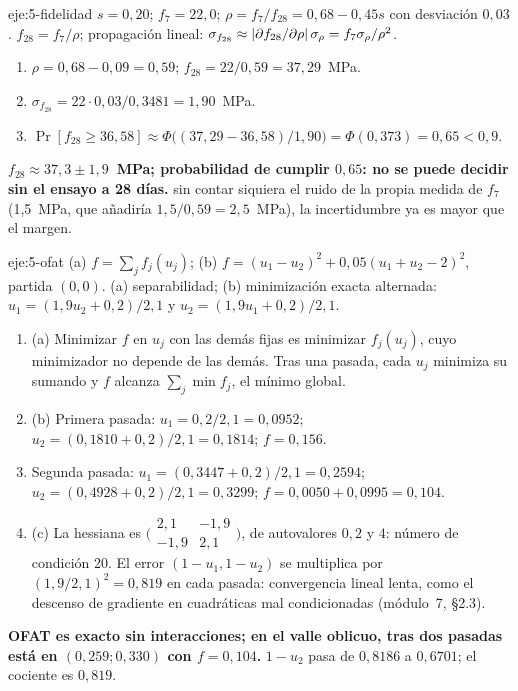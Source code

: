 \begin{solucion}{eje:5-fidelidad}
\datos $s=0{,}20$; $f_7=22{,}0$; $\rho=f_7/f_{28}=0{,}68-0{,}45s$ con desviación $0{,}03$.
\planteamiento $f_{28}=f_7/\rho$; propagación lineal: $\sigma_{f_{28}}\approx\lvert\partial f_{28}/\partial\rho\rvert\,\sigma_\rho=f_7\sigma_\rho/\rho^2$.
\pasos
\begin{enumerate}[label=\arabic*.]
  \item $\rho=0{,}68-0{,}09=0{,}59$; $f_{28}=22/0{,}59=37{,}29$~MPa.
  \item $\sigma_{f_{28}}=22\cdot0{,}03/0{,}3481=1{,}90$~MPa.
  \item $\Pr[f_{28}\ge36{,}58]\approx\Phi\bigl((37{,}29-36{,}58)/1{,}90\bigr)=\Phi(0{,}373)=0{,}65<0{,}9$.
\end{enumerate}
\resultado \textbf{$f_{28}\approx37{,}3\pm1{,}9$~MPa; probabilidad de cumplir $0{,}65$: no se puede decidir sin el ensayo a 28 días.}
\comprobacion sin contar siquiera el ruido de la propia medida de $f_7$ (1,5~MPa, que añadiría $1{,}5/0{,}59=2{,}5$~MPa), la incertidumbre ya es mayor que el margen.
\end{solucion}

\begin{solucion}{eje:5-ofat}
\datos (a) $f=\sum_jf_j(u_j)$; (b) $f=(u_1-u_2)^2+0{,}05(u_1+u_2-2)^2$, partida $(0,0)$.
\planteamiento (a) separabilidad; (b) minimización exacta alternada: $u_1=(1{,}9u_2+0{,}2)/2{,}1$ y $u_2=(1{,}9u_1+0{,}2)/2{,}1$.
\pasos
\begin{enumerate}[label=\arabic*.]
  \item (a) Minimizar $f$ en $u_j$ con las demás fijas es minimizar $f_j(u_j)$, cuyo minimizador no depende de las demás. Tras una pasada, cada $u_j$ minimiza su sumando y $f$ alcanza $\sum_j\min f_j$, el mínimo global.
  \item (b) Primera pasada: $u_1=0{,}2/2{,}1=0{,}0952$; $u_2=(0{,}1810+0{,}2)/2{,}1=0{,}1814$; $f=0{,}156$.
  \item Segunda pasada: $u_1=(0{,}3447+0{,}2)/2{,}1=0{,}2594$; $u_2=(0{,}4928+0{,}2)/2{,}1=0{,}3299$; $f=0{,}0050+0{,}0995=0{,}104$.
  \item (c) La hessiana es $\bigl(\begin{smallmatrix}2{,}1&-1{,}9\\-1{,}9&2{,}1\end{smallmatrix}\bigr)$, de autovalores $0{,}2$ y $4$: número de condición 20. El error $(1-u_1,1-u_2)$ se multiplica por $(1{,}9/2{,}1)^2=0{,}819$ en cada pasada: convergencia lineal lenta, como el descenso de gradiente en cuadráticas mal condicionadas (módulo~7, §2.3).
\end{enumerate}
\resultado \textbf{OFAT es exacto sin interacciones; en el valle oblicuo, tras dos pasadas está en $(0{,}259;0{,}330)$ con $f=0{,}104$.}
\comprobacion $1-u_2$ pasa de $0{,}8186$ a $0{,}6701$; el cociente es $0{,}819$.
\end{solucion}

